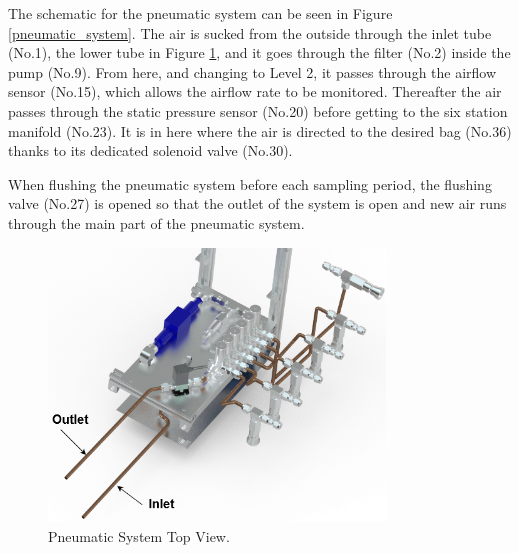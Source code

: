 The schematic for the pneumatic system can be seen in Figure \ref{pneumatic_system}. The air is sucked from the outside through the inlet tube (No.1), the lower tube in Figure \ref{pneumatic_system_cad}, and it goes through the filter (No.2) inside the pump (No.9). From here, and changing to Level 2, it passes through the airflow sensor (No.15), which allows the airflow rate to be monitored. Thereafter the air passes through the static pressure sensor (No.20) before getting to the six station manifold (No.23). It is in here where the air is directed to the desired bag (No.36) thanks to its dedicated solenoid valve (No.30).

When flushing the pneumatic system before each sampling period, the flushing valve (No.27) is opened so that the outlet of the system is open and new air runs through the main part of the pneumatic system. 


\begin{figure}[H]
    \centering
   \includegraphics[width=0.8\textwidth]{4-experiment-design/img/Mechanical/Figure_26.png}
   \caption{Pneumatic System Top View.}
    \label{pneumatic_system_cad}
\end{figure}

